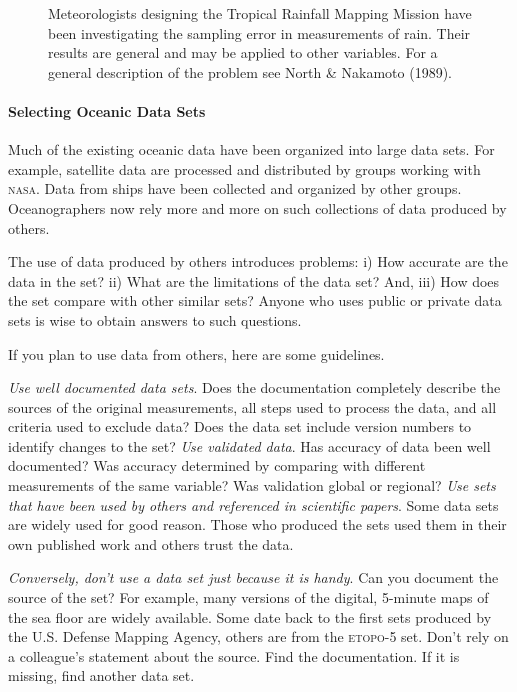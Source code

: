 \begin{figure} [t!]
{{\begin{minipage}{11.5cm}
\hspace*{1 em}Meteorologists designing the Tropical Rainfall Mapping Mission
have been investigating the sampling error in measurements of rain. Their
results are general and may be applied to other variables. For a general
description of the problem see North \& Nakamoto (1989).
\vspace{0.7ex}
\end{minipage}
}}
\vspace{-4ex}
\end{figure}

\paragraph{Selecting Oceanic Data Sets}
Much of the existing oceanic data have been
organized into large data sets. For example, satellite data are
processed and distributed by groups working with \textsc{nasa}.
Data from ships have been collected and organized by other groups.
Oceanographers now rely more and more on such collections of data
produced by others.

The use of data produced by others introduces problems: i) How accurate
are the data in the set? ii) What are the limitations of the data set? And, iii)
How does the set compare with other similar sets? Anyone who uses public or
private data sets is wise to obtain answers to such questions.

If you plan to use data from others, here are some guidelines.

\begin{enumerate}
\vitem \textit{Use well documented data sets}. Does the documentation
completely describe the sources of the original measurements, all steps used to process the data, and all criteria
used to exclude data? Does the data set include version numbers to identify changes to the set? \vitem \textit{Use
validated data}. Has accuracy of data been well
documented? Was accuracy determined by comparing with different measurements of the same
variable? Was validation global or regional? \vitem \textit{Use sets that have been used by
others and referenced in scientific papers}. Some data sets are widely used for good reason.
Those who produced the sets used them in their own published work and others trust the data.

\vitem
\textit{Conversely, don't use a data set just because it is handy}. Can you document
the source of the set? For example, many versions of the digital, 5-minute maps of
the sea floor are widely available. Some date back to the first sets produced by the
U.S. Defense Mapping Agency, others are from the \textsc{etopo-5} set. Don't rely on
a colleague's statement about the source. Find the documentation. If it is missing,
find another data set.
\end{enumerate}

